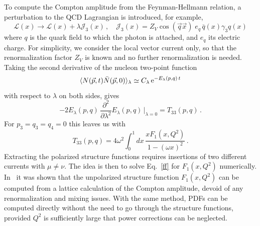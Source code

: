 To compute the Compton amplitude from the Feynman-Hellmann relation, a 
perturbation to the QCD Lagrangian is introduced, for example,
\begin{equation}
\mathcal{L}(x) 
\rightarrow 
\mathcal{L}(x) + \lambda \mathcal{J}_3(x)\,, 
\quad 
\mathcal{J}_3(x)
=
Z_V\cos(\vec{q}\vec{x})\; 
e_q \,\bar{q}(x)\gamma_3 q(x) 
\label{in}
\end{equation}
where $q$ is the quark field to which the photon is attached, and $e_q$ its 
electric charge. 
%
For simplicity, we consider the local vector current only, so that the 
renormalization factor $Z_V$ is known and no further renormalization is needed. 
%
Taking the second derivative of the nucleon two-point function 
\begin{equation}
\langle N(\vec{p},t) \bar{N}(\vec{p},0)\rangle_\lambda 
\simeq 
C_\lambda\, {\rm e}^{-E_\lambda(p,q)\,t}
\end{equation}
with respect to $\lambda$ on both sides, gives
\begin{equation}
-2 E_\lambda(p,q)\, 
\frac{\partial^2}{\partial\lambda^2}  E_\lambda(p,q)\,\big|_{\lambda=0} 
= 
T_{33}(p,q) \,.
\end{equation}
For $p_3=q_3=q_4=0$ this leaves us with
\begin{equation}
T_{33}(p,q) 
= 
4 \omega^2 \int_0^1 dx\,  \frac{xF_1(x,Q^2)}{1-(\omega x)^2} \,.
\label{ff}
\end{equation}
%
Extracting the polarized structure functions requires insertions of two 
different currents with $\mu\neq \nu$. 
%
The idea is then to solve Eq.~\eqref{ff} for $F_1(x,Q^2)$ numerically.
%
In~\cite{Ji:2001wha,Chambers:2017dov} it was shown that the unpolarized 
structure function $F_1(x,Q^2)$ can be computed from a lattice calculation 
of the Compton amplitude, devoid of any renormalization and mixing issues. 
With the same method, PDFs can be computed directly without the need to go 
through the structure functions, provided $Q^2$ is sufficiently large that 
power corrections can be neglected. 

